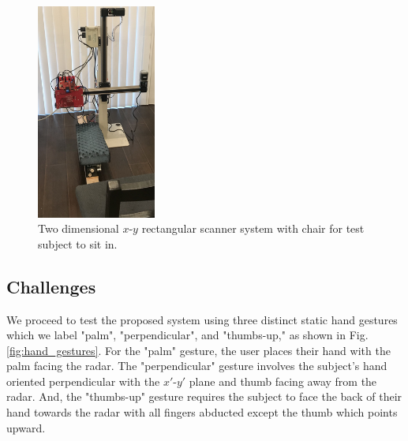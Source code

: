 \documentclass{ieeeaccess}
\begin{document}
\begin{figure}[h]
    \centering
    \includegraphics[width=0.35\textwidth]{smith3.png}
    \caption{Two dimensional $x$-$y$ rectangular scanner system with chair for test subject to sit in.}
    \label{fig:xy_scanner_pic}
\end{figure}

\subsection{Challenges}
\label{subsec:challenges}
We proceed to test the proposed system using three distinct static hand gestures which we label "palm", "perpendicular", and "thumbs-up," as shown in Fig. \ref{fig:hand_gestures}. For the "palm" gesture, the user places their hand with the palm facing the radar. The "perpendicular" gesture involves the subject's hand oriented perpendicular with the $x'$-$y'$ plane and thumb facing away from the radar. And, the "thumbs-up" gesture requires the subject to face the back of their hand towards the radar with all fingers abducted except the thumb which points upward. 
\end{document}
